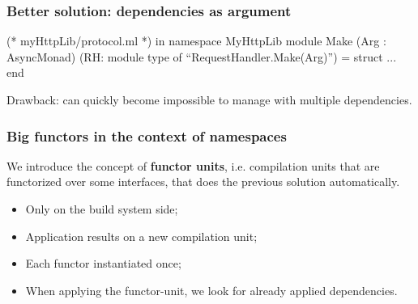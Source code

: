 \documentclass{beamer}
\begin{document}
\begin{frame}[fragile]
\frametitle{Better solution: dependencies as argument}

    \begin{OCaml}
      (* myHttpLib/protocol.ml *)
      in namespace MyHttpLib
      module Make (Arg : AsyncMonad) 
                  (RH: module type of ``RequestHandler.Make(Arg)'') = 
        struct
          ...
        end
    \end{OCaml}

    Drawback: can quickly become impossible to manage with multiple dependencies.
\end{frame}

\begin{frame}
  \frametitle{Big functors in the context of namespaces}

  We introduce the concept of \textbf{functor units}, i.e. compilation units that
  are functorized over some interfaces, that does the previous solution automatically.

  \medskip

  \begin{itemize}
    \item Only on the build system side;
    \item Application results on a new compilation unit;
    \item Each functor instantiated \alert{once};
    \item When applying the functor-unit, we look for already applied
      dependencies.
  \end{itemize}

\end{frame}
\end{document}
